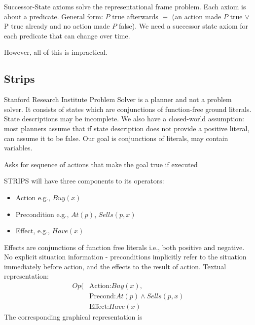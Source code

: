 \documentclass[a4paper]{article}
\theoremstyle{plain}
\theoremstyle{definition}
\newtheorem{defn}{Definition}[section]
\theoremstyle{remark}
\begin{document}
\begin{tcolorbox}[colback=black!3!white,colframe=black!60!white,title=\begin{defn}Successor-State Axioms \label{Successor-State Axioms}\end{defn}]
Successor-State axioms solve the representational frame problem. Each axiom is about a predicate. General form: $P$ true afterwards $\equiv$  (an action made $P$ true $\lor$ P true already and no action made $P$ false). We need a successor state axiom for each predicate that can change over time.
\end{tcolorbox}
However, all of this is impractical.
\subsection{Strips}
Stanford Research Institute Problem Solver is a planner and not a problem solver. It consists of states which are conjunctions of function-free ground literals. State descriptions may be incomplete. We also have a closed-world assumption: most planners assume that if state description does not provide a positive literal, can assume it to be false. Our goal is conjunctions of literals, may contain variables.
\begin{tcolorbox}[colback=black!3!white,colframe=black!60!white,title=\begin{defn}Planner \label{Planner}\end{defn}]
Asks for sequence of actions that make the goal true if executed
\end{tcolorbox}
STRIPS will have three components to its operators:
\begin{itemize}
	\item Action e.g., $Buy(x)$ 
	\item Precondition e.g., $At(p)$, $Sells(p,x)$ 
	\item Effect, e.g., $Have(x)$
\end{itemize}
Effects are conjunctions of function free literals i.e., both positive and negative. No explicit situation information - preconditions implicitly refer to the situation immediately before action, and the effects to the result of action. Textual representation: \\
\begin{align*}
	Op(&\text{Action:}Buy(x), \\
		&\text{Precond:}At(p)\land Sells(p,x) \\
		& \text{Effect:} Have(x)
\end{align*}
The corresponding graphical representation is 
\end{document}
